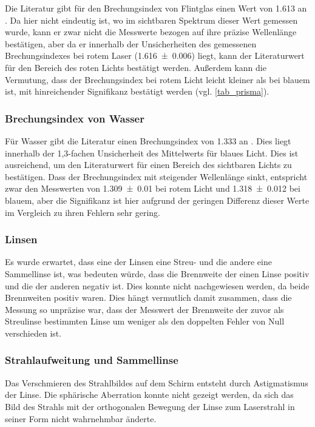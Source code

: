 \documentclass[
	a4paper,
	12pt,
	pagesize,
	ngerman
]{scrartcl}
\begin{document}
	Die Literatur gibt für den Brechungsindex von Flintglas einen Wert von \SI{1,613}{} an \cite{flintglasref}.
	Da hier nicht eindeutig ist, wo im sichtbaren Spektrum dieser Wert gemessen wurde, kann er zwar nicht die Messwerte bezogen auf ihre präzise Wellenlänge bestätigen, aber da er innerhalb der Unsicherheiten des gemessenen Brechungsindexes bei rotem Laser (\SI{1,616 \pm 0,006}{}) liegt, kann der Literaturwert für den Bereich des roten Lichts bestätigt werden.
	Außerdem kann die Vermutung, dass der Brechungsindex bei rotem Licht leicht kleiner als bei blauem ist, mit hinreichender Signifikanz bestätigt werden (vgl. \cref{tab_prisma}).
	
	\subsubsection{Brechungsindex von Wasser}
	Für Wasser gibt die Literatur einen Brechungsindex von \SI{1,333}{} an \cite{flintglasref}.
	Dies liegt innerhalb der 1,3-fachen Unsicherheit des Mittelwerts für blaues Licht.
	Dies ist ausreichend, um den Literaturwert für einen Bereich des sichtbaren Lichts zu bestätigen.
	Dass der Brechungsindex mit steigender Wellenlänge sinkt, entspricht zwar den Messwerten von \SI{1,309 \pm 0,01}{} bei rotem Licht und \SI{1,318 \pm 0,012}{} bei blauem, aber die Signifikanz ist hier aufgrund der geringen Differenz dieser Werte im Vergleich zu ihren Fehlern sehr gering.
	
	\subsubsection{Linsen}
	
	Es wurde erwartet, dass eine der Linsen eine Streu- und die andere eine Sammellinse ist, was bedeuten würde, dass die Brennweite der einen Linse positiv und die der anderen negativ ist.
	Dies konnte nicht nachgewiesen werden, da beide Brennweiten positiv waren.
	Dies hängt vermutlich damit zusammen, dass die Messung so unpräzise war, dass der Messwert der Brennweite der zuvor als Streulinse bestimmten Linse um weniger als den doppelten Fehler von Null verschieden ist. %
	
	\subsubsection{Strahlaufweitung und Sammellinse}
	Das Verschmieren des Strahlbildes auf dem Schirm entsteht durch Astigmatismus der Linse. %
	Die sphärische Aberration konnte nicht gezeigt werden, da sich das Bild des Strahls mit der orthogonalen Bewegung der Linse zum Laserstrahl in seiner Form nicht wahrnehmbar änderte.
\end{document}
